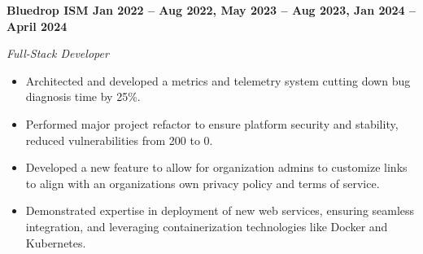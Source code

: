 \vspace{0.1cm}
\textbf{Bluedrop ISM \hfill Jan 2022 -- Aug 2022, May 2023 -- Aug 2023, Jan 2024 -- April 2024} \par
\textit{Full-Stack Developer} \par
\begin{itemize}
	\item Architected and developed a metrics and telemetry system cutting down bug diagnosis time by 25\%.
    \item Performed major project refactor to ensure platform security and stability, reduced vulnerabilities from 200 to 0.
    \item Developed a new feature to allow for organization admins to customize links to align with an organizations own privacy policy and terms of service.
    \item Demonstrated expertise in deployment of new web services, ensuring seamless integration, and leveraging containerization technologies like Docker and Kubernetes.
\end{itemize} \par